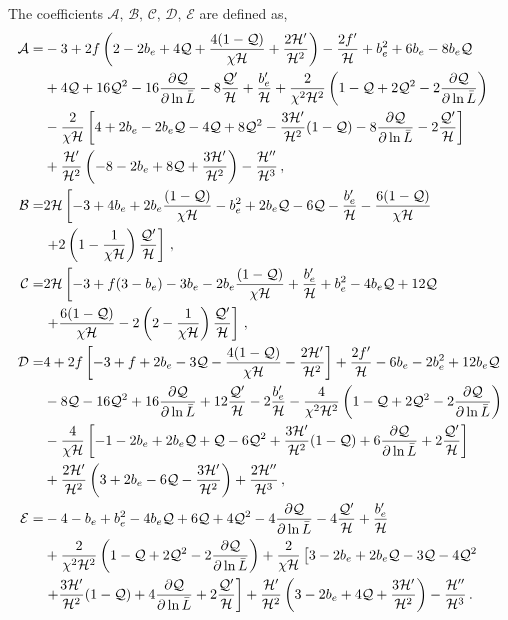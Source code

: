 The coefficients $\mathcal{A},\,\mathcal{B},\,\mathcal{C},\,\mathcal{D},\,\mathcal{E}$ are defined as, 
\begin{align}
	\mathcal{A} =& -3 + 2f \left(2 - 2b_e + 4 \mathcal{Q} + \frac{4(1-\mathcal{Q})}{\chi\mathcal{H}} + \frac{2\mathcal{H}'}{\mathcal{H}^{2}} \right) -\frac{2f'}{\mathcal{H}} + b_e^2 + 6 b_e - 8 b_e \mathcal{Q} \nonumber \\
	& + 4 \mathcal{Q} + 16 \mathcal{Q}^2 - 16\frac{\partial \mathcal{Q}}{\partial \ln\bar{L}} -8 \frac{\mathcal{Q}'}{\mathcal{H}} + \frac{b_e'}{\mathcal{H}} + \frac{2}{\chi^{2}\mathcal{H}^2} \left(1 - \mathcal{Q} + 2\mathcal{Q}^2 - 2\frac{\partial \mathcal{Q}}{\partial \ln{\bar{L}}} \right) \nonumber \\
	& - \frac{2}{\chi \mathcal{H}} \left[ 4 + 2b_e - 2 b_e \mathcal{Q} - 4\mathcal{Q} + 8\mathcal{Q}^2 - \frac{3\mathcal{H}'}{\mathcal{H}^2}(1 - \mathcal{Q}) - 8\frac{\partial \mathcal{Q}}{\partial \ln{\bar{L}}} - 2\frac{\mathcal{Q}'}{\mathcal{H}} \right] \nonumber \\
	& + \frac{\mathcal{H}'}{\mathcal{H}^2} \left(-8 - 2b_e + 8\mathcal{Q} + \frac{3\mathcal{H}'}{\mathcal{H}^2} \right) - \frac{\mathcal{H}''}{\mathcal{H}^3}\,,\label{eq:bcA} \\
	\mathcal{B} =& 2\mathcal{H} \left[ -3 + 4 b_e + 2b_e \frac{(1 - \mathcal{Q})}{\chi \mathcal{H}} -b_e^2 + 2b_e \mathcal{Q} - 6\mathcal{Q} - \frac{b_e'}{\mathcal{H}} - \frac{6( 1 - \mathcal{Q})}{\chi\mathcal{H}} \right. \nonumber \\
	& \left. + 2\left(1 - \frac{1}{\chi\mathcal{H}} \right) \frac{\mathcal{Q}'}{\mathcal{H}} \right]\,,\\
	\mathcal{C} =& 2\mathcal{H} \left[ -3 + f(3 - b_e) - 3b_e - 2 b_e \frac{(1 - \mathcal{Q})}{\chi\mathcal{H}} + \frac{b_e'}{\mathcal{H}} + b_e^2 - 4 b_e \mathcal{Q} + 12\mathcal{Q} \right. \nonumber \\
	&\left. + \frac{6 (1 - \mathcal{Q})}{\chi\mathcal{H}} - 2\left(2 -\frac{1}{\chi\mathcal{H}}\right) \frac{\mathcal{Q}'}{\mathcal{H}} \right]\,\label{eq:bcC}, \\
	\mathcal{D} =& 4 +2f\left[ -3 + f + 2b_e - 3\mathcal{Q} - \frac{4(1 - \mathcal{Q})}{\chi\mathcal{H}} - \frac{2\mathcal{H}'}{\mathcal{H}^2} \right] +\frac{2f'}{\mathcal{H}} - 6b_e - 2 b_e^2 + 12 b_e\mathcal{Q} \nonumber \\
	& - 8 \mathcal{Q} - 16\mathcal{Q}^2 + 16 \frac{\partial \mathcal{Q}}{\partial \ln{\bar{L}}} + 12 \frac{\mathcal{Q}'}{\mathcal{H}} - 2\frac{b_e'}{\mathcal{H}} - \frac{4}{\chi^2 \mathcal{H}^2} \left(1 - \mathcal{Q} + 2\mathcal{Q}^2 - 2 \frac{\partial \mathcal{Q}}{\partial \ln{\bar{L}}} \right) \nonumber \\
	& - \frac{4}{\chi \mathcal{H}} \left[ -1 -2b_e + 2b_e\mathcal{Q} + \mathcal{Q} - 6\mathcal{Q}^2 + \frac{3\mathcal{H}'}{\mathcal{H}^2}(1 - \mathcal{Q}) + 6 \frac{\partial \mathcal{Q}}{\partial \ln{\bar{L}}} + 2\frac{\mathcal{Q}'}{\mathcal{H}} \right] \nonumber \\
	&+ \frac{2\mathcal{H}'}{\mathcal{H}^2} \left(3 + 2b_e - 6\mathcal{Q} - \frac{3\mathcal{H}'}{\mathcal{H}^2} \right) + \frac{2\mathcal{H}''}{\mathcal{H}^3}\,, \\
	\mathcal{E} =& -4 - b_e + b_e^2 - 4b_e\mathcal{Q} + 6 \mathcal{Q} + 4\mathcal{Q}^2 - 4\frac{\partial \mathcal{Q}}{\partial \ln{\bar{L}}} - 4\frac{\mathcal{Q}'}{\mathcal{H}} + \frac{b_e'}{\mathcal{H}} \nonumber \\
	&+ \frac{2}{\chi^2\mathcal{H}^2} \left(1 - \mathcal{Q} + 2\mathcal{Q}^2 - 2\frac{\partial \mathcal{Q}}{\partial \ln{\bar{L}}}\right) + \frac{2}{\chi\mathcal{H}} \left[3 - 2b_e + 2b_e \mathcal{Q} - 3\mathcal{Q} - 4\mathcal{Q}^2 \right. \nonumber \\
	&\left. + \frac{3\mathcal{H}'}{\mathcal{H}^2} (1 - \mathcal{Q}) + 4\frac{\partial \mathcal{Q}}{\partial \ln{\bar{L}}} + 2\frac{\mathcal{Q}'}{\mathcal{H}} \right] + \frac{\mathcal{H}'}{\mathcal{H}^2} \left(3 - 2b_e + 4\mathcal{Q} + \frac{3\mathcal{H}'}{\mathcal{H}^2} \right) - \frac{\mathcal{H}''}{\mathcal{H}^3}\,.
\end{align}
